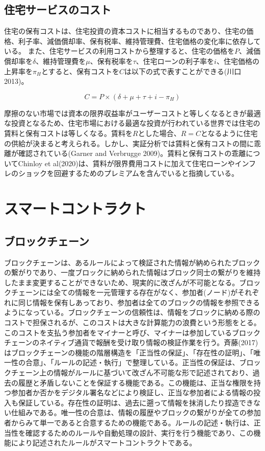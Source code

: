 \documentclass[a4paper,fontsize=11pt,report,notitlepage,line_length=38zw,number_of_lines=40,dvipdfmx]{jlreq}
\begin{document}
\subsection{住宅サービスのコスト}
住宅の保有コストは、住宅投資の資本コストに相当するものであり、住宅の価格、利子率、減価償却率、保有税率、維持管理費、住宅価格の変化率に依存している。
また、住宅サービスの利用コストから整理すると、住宅の価格を$P$、減価償却率を$\delta$、維持管理費を$\mu$、保有税率を$\tau$、住宅ローンの利子率を$i$、住宅価格の上昇率を$\pi_H$とすると、保有コストを$C$は以下の式で表すことができる(川口 2013)\cite{kawaguchi2013}。

\begin{equation}
C=P\times(\delta+\mu+\tau+i-\pi_H)
\end{equation}

摩擦のない市場では資本の限界収益率がユーザーコストと等しくなるときが最適な投資となるため、住宅市場における最適な投資が行われている世界では住宅の賃料と保有コストは等しくなる。賃料を$R$とした場合、$R=C$となるように住宅の供給が決まると考えられる。しかし、実証分析では賃料と保有コストの間に乖離が確認されている(Garner and Verbrugge 2009)\cite{garner2009}。賃料と保有コストの乖離についてChinloy et al(2020)\cite{chinloy2020}は、賃料が限界費用コストに加えて住宅ローンやインフレのショックを回避するためのプレミアムを含んでいると指摘している。

\section{スマートコントラクト}
\subsection{ブロックチェーン}
ブロックチェーンは、あるルールによって検証された情報が納められたブロックの繋がりであり、一度ブロックに納められた情報はブロック同士の繋がりを維持したまま変更することができないため、現実的に改ざんが不可能となる。ブロックチェーンには全ての情報を一元管理する存在がなく、参加者(ノード)がそれぞれに同じ情報を保有しあっており、参加者は全てのブロックの情報を参照できるようになっている。ブロックチェーンの信頼性は、情報をブロックに納める際のコストで担保されるが、このコストは大きな計算能力の浪費という形態をとる。このコストを支払う参加者をマイナーと呼び、マイナーは参加しているブロックチェーンのネイティブ通貨で報酬を受け取り情報の検証作業を行う。斉藤(2017)\cite{saito2017}はブロックチェーンの機能の階層構造を「正当性の保証」、「存在性の証明」、「唯一性の合意」、「ルールの記述・執行」で整理している。正当性の保証は、ブロックチェーン上の情報がルールに基づいて改ざん不可能な形で記述されており、過去の履歴と矛盾しないことを保証する機能である。この機能は、正当な権限を持つ参加者か否かをデジタル署名などにより検証し、正当な参加者による情報の投入も保証している。存在性の証明は、過去に遡って情報を抹消したり捏造できない仕組みである。唯一性の合意は、情報の履歴やブロックの繋がりが全ての参加者からみて単一であると合意するための機能である。ルールの記述・執行は、正当性を確認するためのルールや自動処理の設計、実行を行う機能であり、この機能により記述されたルールがスマートコントラクトである。
\end{document}
